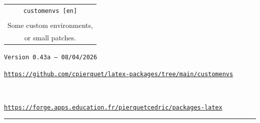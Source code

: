 \documentclass[english,11pt,a4paper]{article}
\def\TPversion{0.43a}
\def\TPdate{08/04/2026}
\begin{document}
\pagestyle{fancy}

\thispagestyle{empty}

\begin{center}
	\begin{minipage}{0.75\linewidth}
	\begin{tcolorbox}[colframe=yellow,colback=yellow!15]
		\begin{center}
			\renewcommand\arraystretch{1.25}
			\begin{tabular}{c}
				{\Huge \texttt{customenvs [en]}}\\
				\\
				{\Large Some custom environments,} \\
				{\Large or small patches.} \\
			\end{tabular}
			\renewcommand\arraystretch{1}

			\medskip

			{\small \texttt{Version \TPversion{} -- \TPdate}}
		\end{center}
	\end{tcolorbox}
\end{minipage}
\end{center}

\begin{center}
\begin{minipage}{0.85\linewidth}
	\begin{tcolorbox}[colframe=teal,colback=teal!10,halign=center,fontupper=\footnotesize]
		\texttt{\url{https://github.com/cpierquet/latex-packages/tree/main/customenvs}}

		~

		\texttt{\url{https://forge.apps.education.fr/pierquetcedric/packages-latex}}
	\end{tcolorbox}
\end{minipage}
\end{center}

\vspace*{5mm}

%
%
%
%
%

\hrule


\end{document}
